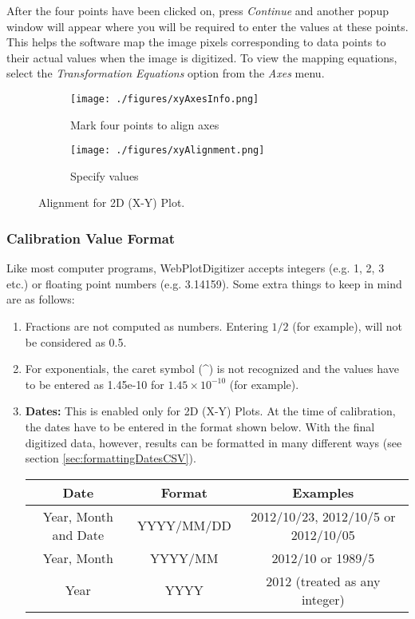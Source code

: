 \documentclass[letterpaper, 10pt]{article}
\begin{document}
After the four points have been clicked on, press \emph{Continue} and another popup window will appear where you will be required to enter the values at these points. This helps the software map the image pixels corresponding to data points to their actual values when the image is digitized. To view the mapping equations, select the \emph{Transformation Equations} option from the \emph{Axes} menu.

\begin{figure}
\centering
{\begin{subfigure}[b]{0.4\textwidth}
\texttt{[image: ./figures/xyAxesInfo.png]}
\caption{Mark four points to align axes}
\end{subfigure}
\begin{subfigure}[b]{0.4\textwidth}
\texttt{[image: ./figures/xyAlignment.png]}
\caption{Specify values}
\end{subfigure}}
\caption{Alignment for 2D (X-Y) Plot.}
\label{fig:xyAlignment}
\end{figure}

\subsubsection{Calibration Value Format}
\label{sec:formattingInput}
Like most computer programs, WebPlotDigitizer accepts integers (e.g. 1, 2, 3 etc.) or floating point numbers (e.g. 3.14159). Some extra things to keep in mind are as follows:
\begin{enumerate}
\item{Fractions are not computed as numbers. Entering $1/2$ (for example), will not be considered as 0.5.}
\item{For exponentials, the caret symbol (\^{}) is not recognized and the values have to be entered as 1.45e-10 for $1.45 \times 10^{-10}$ (for example).}
\item{{\bf Dates:} This is enabled only for 2D (X-Y) Plots. At the time of calibration, the dates have to be entered in the format shown below. With the final digitized data, however, results can be formatted in many different ways (see section \ref{sec:formattingDatesCSV}).
\begin{center}
\begin{tabular}{|c|c|c|}
\hline
Date & Format & Examples\\
\hline
Year, Month and Date & YYYY/MM/DD & 2012/10/23, 2012/10/5 or 2012/10/05\\
Year, Month & YYYY/MM & 2012/10 or 1989/5\\
Year & YYYY & 2012 (treated as any integer)\\
\hline
\end{tabular}
\end{center}
}
\end{enumerate}
\end{document}
